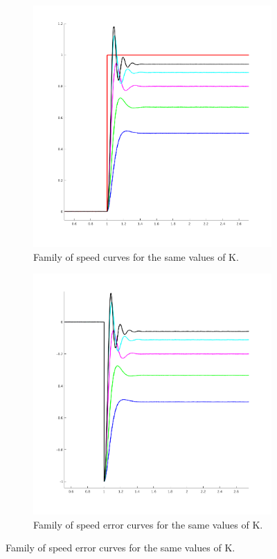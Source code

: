 \documentclass[11pt,a4paper]{article}
\begin{document}
\begin{enumerate}
\begin{figure}[h!]
	\centering
	\begin{subfigure}{.5\textwidth}
		\centering
		\includegraphics[width=\textwidth]{imglab/lab4sol_stepspeedkfam.png}
		\caption{Family of speed curves for the same values of K.}
	\end{subfigure}%
	\begin{subfigure}{.5\textwidth}
		\centering
		\includegraphics[width=\textwidth]{imglab/lab4sol_stepspeederr.png}
		\caption{Family of speed error curves for the same values of K. }	
	\end{subfigure}
\end{figure}


\end{enumerate}
\end{document}
